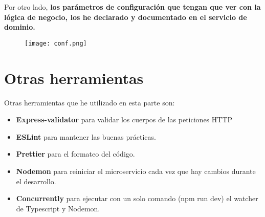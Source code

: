 	Por otro lado, \textbf{los parámetros de configuración que tengan que ver con la lógica
	de negocio, los he declarado y documentado en el servicio de dominio.}

\begin{figure}[H]
	\centering	
	\texttt{[image: conf.png]}
	\end{figure}



\section{Otras herramientas}\label{sec:tools}
Otras herramientas que he utilizado en esta parte son:
\begin{itemize}
	\item \textbf{Express-validator} para validar los cuerpos de las peticiones HTTP
	\item \textbf{ESLint} para mantener las buenas prácticas.
	\item \textbf{Prettier} para el formateo del código.
	\item \textbf{Nodemon} para reiniciar el microservicio cada vez que hay cambios durante el desarrollo.
	\item \textbf{Concurrently} para ejecutar con un solo comando (npm run dev) el watcher de Typescript y Nodemon.
\end{itemize}